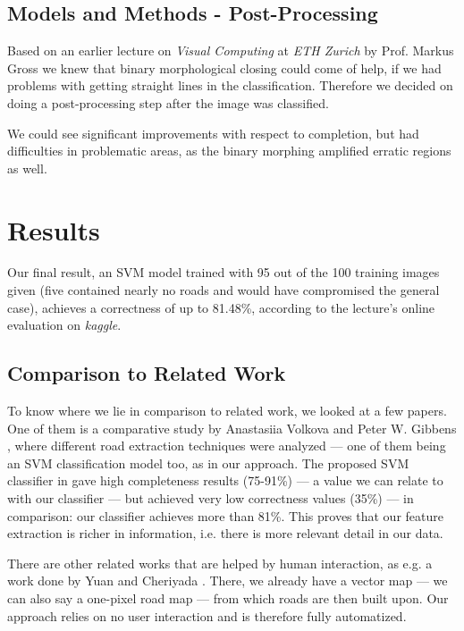 \documentclass[10pt,conference,compsocconf]{IEEEtran}
\begin{document}
\subsection{Models and Methods - Post-Processing}

Based on an earlier lecture on \emph{Visual Computing} at \emph{ETH Zurich} by Prof. Markus Gross we knew that binary morphological closing could come of help, if we had problems with getting straight lines in the classification. Therefore we decided on doing a post-processing step after the image was classified.

We could see significant improvements with respect to completion, but had difficulties in problematic areas, as the binary morphing amplified erratic regions as well.

\section{Results}
\label{sec:results}

Our final result, an SVM model trained with 95 out of the 100 training images given (five contained nearly no roads and would have compromised the general case), achieves a correctness of up to 81.48\%, according to the lecture's online evaluation on \emph{kaggle}.

\subsection{Comparison to Related Work}
\label{sec:comparison}
To know where we lie in comparison to related work, we looked at a few papers. One of them is a comparative study by Anastasiia Volkova and Peter W. Gibbens \cite{VoGi15}, where different road extraction techniques were analyzed --- one of them being an SVM classification model too, as in our approach. The proposed SVM classifier in \cite{VoGi15} gave high completeness results (75-91\%) --- a value we can relate to with our classifier --- but achieved very low correctness values (35\%) --- in comparison: our classifier achieves more than 81\%. This proves that our feature extraction is richer in information, i.e. there is more relevant detail in our data.

There are other related works that are helped by human interaction, as e.g. a work done by Yuan and Cheriyada \cite{YuCh13}. There, we already have a vector map --- we can also say a one-pixel road map --- from which roads are then built upon. Our approach relies on no user interaction and is therefore fully automatized.
\end{document}
